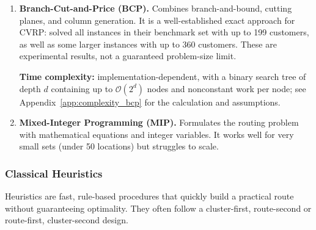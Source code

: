 \documentclass[11pt]{article}
\begin{document}
\begin{enumerate}
    \item \textbf{Branch-Cut-and-Price (BCP).} Combines branch-and-bound, cutting planes, and column generation. It is a well-established exact approach for CVRP: \textcite{pecin2017improved_bcp} solved all instances in their benchmark set with up to 199 customers, as well as some larger instances with up to 360 customers. These are experimental results, not a guaranteed problem-size limit.

    \textbf{Time complexity:} implementation-dependent, with a binary search tree of depth $d$ containing up to $\mathcal{O}(2^d)$ nodes and nonconstant work per node; see Appendix~\ref{app:complexity_bcp} for the calculation and assumptions.
    \item \textbf{Mixed-Integer Programming (MIP).} Formulates the routing problem with mathematical equations and integer variables. It works well for very small sets (under 50 locations) but struggles to scale.
\end{enumerate}

\subsubsection{Classical Heuristics}
Heuristics are fast, rule-based procedures that quickly build a practical route without guaranteeing optimality. They often follow a cluster-first, route-second or route-first, cluster-second design.
\end{document}
